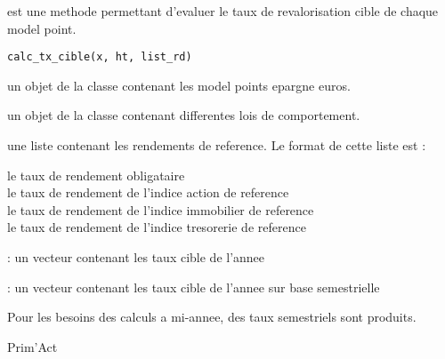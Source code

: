 \documentclass[a4paper]{book}
\begin{document}
%
\begin{Description}\relax
{} est une methode permettant d'evaluer le taux de revalorisation cible
de chaque model point.
\end{Description}
%
\begin{Usage}
\begin{verbatim}
calc_tx_cible(x, ht, list_rd)
\end{verbatim}
\end{Usage}
%
\begin{Arguments}
\begin{ldescription}
\item[\code{x}] un objet de la classe  contenant les model points epargne euros.

\item[\code{ht}] un objet de la classe  contenant differentes lois de comportement.

\item[\code{list\_rd}] une liste contenant les rendements de reference. Le format de cette liste est :
\begin{description}

\item[le taux de rendement obligataire] 
\item[le taux de rendement de l'indice action de reference] 
\item[le taux de rendement de l'indice immobilier de reference] 
\item[le taux de rendement de l'indice tresorerie de reference] 

\end{description}

\end{ldescription}
\end{Arguments}
%
\begin{Value}
 : un vecteur contenant les taux cible de l'annee

 : un vecteur contenant les taux cible de l'annee sur base semestrielle
\end{Value}
%
\begin{Note}\relax
Pour les besoins des calculs a mi-annee, des taux semestriels sont produits.
\end{Note}
%
\begin{Author}\relax
Prim'Act
\end{Author}
\end{document}

